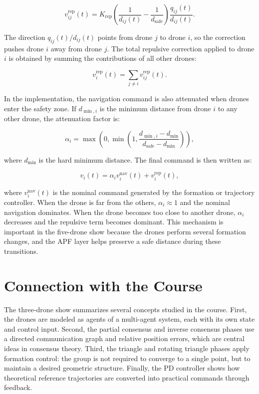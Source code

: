 \begin{equation}
    v_{ij}^{\text{rep}}(t)=K_{\text{rep}}\left(\frac{1}{d_{ij}(t)}-\frac{1}{d_{\text{safe}}}\right)\frac{q_{ij}(t)}{d_{ij}(t)}.
\end{equation}

The direction $q_{ij}(t)/d_{ij}(t)$ points from drone $j$ to drone $i$, so the correction pushes drone $i$ away from drone $j$. The total repulsive correction applied to drone $i$ is obtained by summing the contributions of all other drones:

\begin{equation}
    v_i^{\text{rep}}(t)=\sum_{j\neq i} v_{ij}^{\text{rep}}(t).
\end{equation}

In the implementation, the navigation command is also attenuated when drones enter the safety zone. If $d_{\min,i}$ is the minimum distance from drone $i$ to any other drone, the attenuation factor is:

\begin{equation}
    \alpha_i=\max\left(0,\min\left(1,\frac{d_{\min,i}-d_{\min}}{d_{\text{safe}}-d_{\min}}\right)\right),
\end{equation}

where $d_{\min}$ is the hard minimum distance. The final command is then written as:

\begin{equation}
    v_i(t)=\alpha_i v_i^{\text{nav}}(t)+v_i^{\text{rep}}(t),
\end{equation}

where $v_i^{\text{nav}}(t)$ is the nominal command generated by the formation or trajectory controller. When the drone is far from the others, $\alpha_i\approx 1$ and the nominal navigation dominates. When the drone becomes too close to another drone, $\alpha_i$ decreases and the repulsive term becomes dominant. This mechanism is important in the five-drone show because the drones perform several formation changes, and the APF layer helps preserve a safe distance during these transitions.

\section{Connection with the Course}

The three-drone show summarizes several concepts studied in the course. First, the drones are modeled as agents of a multi-agent system, each with its own state and control input. Second, the partial consensus and inverse consensus phases use a directed communication graph and relative position errors, which are central ideas in consensus theory. Third, the triangle and rotating triangle phases apply formation control: the group is not required to converge to a single point, but to maintain a desired geometric structure. Finally, the PD controller shows how theoretical reference trajectories are converted into practical commands through feedback.

